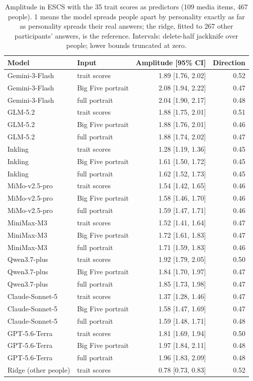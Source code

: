 \begin{table}[H]\centering\scriptsize\setlength{\tabcolsep}{2.5pt}
\begin{tabular}{@{}llrr@{}}\toprule
Model & Input & Amplitude [95\% CI] & Direction \\ \midrule
Gemini-3-Flash & trait scores & 1.89 [1.76, 2.02] & 0.52 \\
Gemini-3-Flash & Big Five portrait & 2.08 [1.94, 2.22] & 0.47 \\
Gemini-3-Flash & full portrait & 2.04 [1.90, 2.17] & 0.48 \\
GLM-5.2 & trait scores & 1.88 [1.75, 2.01] & 0.51 \\
GLM-5.2 & Big Five portrait & 1.88 [1.76, 2.01] & 0.46 \\
GLM-5.2 & full portrait & 1.88 [1.74, 2.02] & 0.47 \\
Inkling & trait scores & 1.28 [1.19, 1.36] & 0.45 \\
Inkling & Big Five portrait & 1.61 [1.50, 1.72] & 0.45 \\
Inkling & full portrait & 1.62 [1.52, 1.73] & 0.45 \\
MiMo-v2.5-pro & trait scores & 1.54 [1.42, 1.65] & 0.46 \\
MiMo-v2.5-pro & Big Five portrait & 1.58 [1.46, 1.70] & 0.46 \\
MiMo-v2.5-pro & full portrait & 1.59 [1.47, 1.71] & 0.46 \\
MiniMax-M3 & trait scores & 1.52 [1.41, 1.64] & 0.47 \\
MiniMax-M3 & Big Five portrait & 1.72 [1.61, 1.83] & 0.47 \\
MiniMax-M3 & full portrait & 1.71 [1.59, 1.83] & 0.46 \\
Qwen3.7-plus & trait scores & 1.92 [1.79, 2.05] & 0.50 \\
Qwen3.7-plus & Big Five portrait & 1.84 [1.70, 1.97] & 0.47 \\
Qwen3.7-plus & full portrait & 1.85 [1.73, 1.98] & 0.47 \\
Claude-Sonnet-5 & trait scores & 1.37 [1.28, 1.46] & 0.47 \\
Claude-Sonnet-5 & Big Five portrait & 1.58 [1.47, 1.69] & 0.47 \\
Claude-Sonnet-5 & full portrait & 1.59 [1.48, 1.71] & 0.48 \\
GPT-5.6-Terra & trait scores & 1.81 [1.69, 1.94] & 0.50 \\
GPT-5.6-Terra & Big Five portrait & 1.97 [1.84, 2.11] & 0.48 \\
GPT-5.6-Terra & full portrait & 1.96 [1.83, 2.09] & 0.48 \\
\midrule
Ridge (other people) & trait scores & 0.78 [0.73, 0.83] & 0.52 \\
\bottomrule\end{tabular}
\caption{Amplitude in ESCS with the 35 trait scores as predictors (109 media items, 467 people). 1 means the model spreads people apart by personality exactly as far as personality spreads their real answers; the ridge, fitted to 267 other participants' answers, is the reference. Intervals: delete-half jackknife over people; lower bounds truncated at zero.}
\label{tab:amp35}\end{table}

